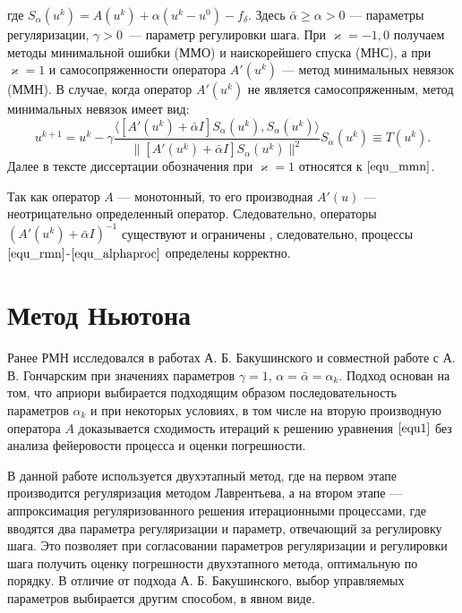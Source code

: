 где $S_\alpha(u^k)=A(u^k)+\alpha(u^k-u^0)-f_\delta$. Здесь $\bar\alpha \ge \alpha >0$ --- параметры регуляризации, $\gamma>0$~--- параметр регулировки шага. При $\varkappa=-1,0$ получаем методы минимальной ошибки (ММО) и наискорейшего спуска (МНС), а при $\varkappa=1$ и самосопряженности оператора $A'(u^k)$ --- метод минимальных невязок (ММН).    
В случае, когда оператор $A'(u^k)$ не является самосопряженным, метод минимальных невязок имеет вид:
\begin{equation}\label{equ_mmn}
u^{k+1} =u^k - \gamma\frac{\langle [A'(u^k)+\bar{\alpha}I]S_\alpha(u^k), S_\alpha (u^k)\rangle}{\|[A'(u^k)+\bar{\alpha}I]S_\alpha(u^k)\|^2}S_\alpha (u^k)\equiv{T(u^k)}.
\end{equation}
Далее в тексте диссертации обозначения при $\varkappa=1$ относятся к $\eqref{equ_mmn}$.

Так как оператор $A$ --- монотонный, то его производная $A'(u)$ --- неотрицательно определенный оператор. Следовательно, операторы $(A'(u^k)+\bar\alpha I)^{-1}$ существуют и ограничены \cite{Bak1976}, следовательно, процессы $\eqref{equ_rmn}$-$\eqref{equ_alphaproc}$ определены корректно.

\newpage
\section{Метод Ньютона}
Ранее РМН исследовался в работах А. Б. Бакушинского \cite{Bak1976,Bak1992} и совместной работе с А. В. Гончарским \cite{BakGon1989} при значениях параметров $\gamma=1$, $\alpha=\bar{\alpha}=\alpha_k$. Подход основан на том, что априори выбирается подходящим образом последовательность параметров $\alpha_k$ и при некоторых условиях, в том числе на вторую производную оператора $A$ доказывается сходимость итераций к решению уравнения $\eqref{equ1}$ без анализа фейеровости процесса и оценки погрешности. 

В данной работе используется двухэтапный метод, где на первом этапе производится регуляризация методом Лаврентьева, а на втором этапе --- аппроксимация регуляризованного решения итерационными процессами, где вводятся два параметра регуляризации и параметр, отвечающий за регулировку шага. Это позволяет при согласовании параметров регуляризации и регулировки шага получить оценку погрешности двухэтапного метода, оптимальную по порядку. В отличие от подхода А. Б. Бакушинского, выбор управляемых параметров выбирается другим способом, в явном виде. 


